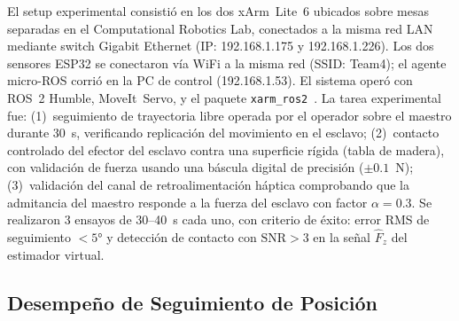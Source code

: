 \documentclass[journal,10pt,twoside]{IEEEtran}
\begin{document}
El setup experimental consistió en los dos xArm~Lite~6 ubicados sobre
mesas separadas en el Computational Robotics Lab, conectados a la misma
red LAN mediante switch Gigabit Ethernet (IP: 192.168.1.175 y 192.168.1.226).
Los dos sensores ESP32 se conectaron vía WiFi a la misma red (SSID: Team4);
el agente micro-ROS corrió en la PC de control (192.168.1.53).
El sistema operó con ROS~2 Humble, MoveIt~Servo, y el paquete
\texttt{xarm\_ros2}~\cite{xarm_ros2}. La tarea experimental fue:
(1)~seguimiento de trayectoria libre operada por el operador sobre el
maestro durante 30~s, verificando replicación del movimiento en el esclavo;
(2)~contacto controlado del efector del esclavo contra una superficie
rígida (tabla de madera), con validación de fuerza usando una báscula
digital de precisión ($\pm0.1$~N); (3)~validación del canal de
retroalimentación háptica comprobando que la admitancia del maestro
responde a la fuerza del esclavo con factor $\alpha=0.3$. Se realizaron
3 ensayos de 30--40~s cada uno, con criterio de éxito:
error RMS de seguimiento $<5°$ y detección de contacto con
$\text{SNR} > 3$ en la señal $\hat{F}_z$ del estimador virtual.

\subsection{Desempeño de Seguimiento de Posición}
\end{document}
